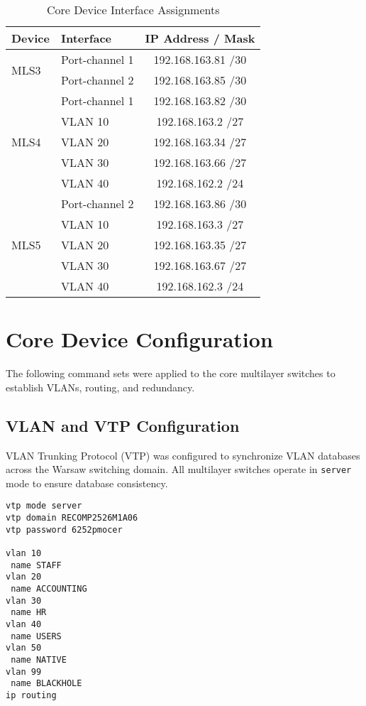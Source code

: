 \begin{table}[h!]
\centering
\caption{Core Device Interface Assignments}
\begin{tabular}{|l|l|c|}
\hline
\textbf{Device} & \textbf{Interface} & \textbf{IP Address / Mask} \\
\hline
\multirow{2}{*}{MLS3} & Port-channel 1 & 192.168.163.81 /30 \\
                      & Port-channel 2 & 192.168.163.85 /30 \\
\hline
\multirow{5}{*}{MLS4} & Port-channel 1 & 192.168.163.82 /30 \\
                      & VLAN 10 & 192.168.163.2 /27 \\
                      & VLAN 20 & 192.168.163.34 /27 \\
                      & VLAN 30 & 192.168.163.66 /27 \\
                      & VLAN 40 & 192.168.162.2 /24 \\
\hline
\multirow{5}{*}{MLS5} & Port-channel 2 & 192.168.163.86 /30 \\
                      & VLAN 10 & 192.168.163.3 /27 \\
                      & VLAN 20 & 192.168.163.35 /27 \\
                      & VLAN 30 & 192.168.163.67 /27 \\
                      & VLAN 40 & 192.168.162.3 /24 \\
\hline
\end{tabular}
\label{tab:warsaw-core}
\end{table}


\section{Core Device Configuration}

The following command sets were applied to the core multilayer switches to establish VLANs, routing, and redundancy.

\subsection{VLAN and VTP Configuration}

VLAN Trunking Protocol (VTP) was configured to synchronize VLAN databases across the Warsaw switching domain.  
All multilayer switches operate in \texttt{server} mode to ensure database consistency.

\begin{lstlisting}[caption={VLAN and VTP configuration}, label={lst:warsaw-vtp}]
vtp mode server
vtp domain RECOMP2526M1A06
vtp password 6252pmocer

vlan 10
 name STAFF
vlan 20
 name ACCOUNTING
vlan 30
 name HR
vlan 40
 name USERS
vlan 50
 name NATIVE
vlan 99
 name BLACKHOLE
ip routing
\end{lstlisting}

